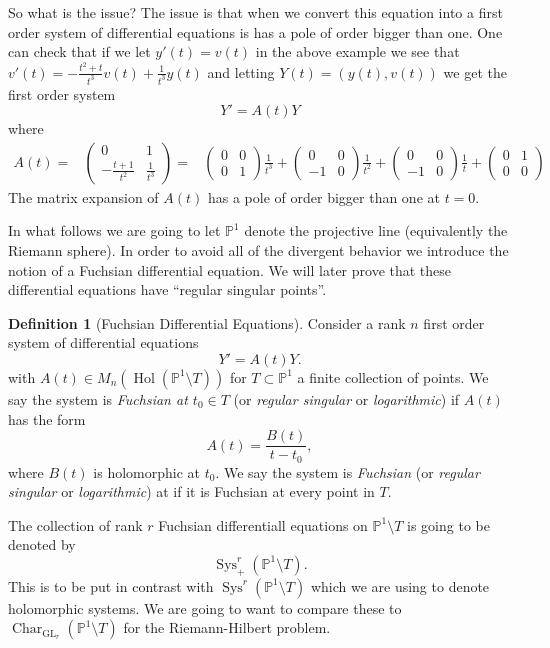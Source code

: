 \documentclass[12pt]{book}
\numberwithin{equation}{section}
\theoremstyle{definition}
\newtheorem{definition}[theorem]{Definition}
\theoremstyle{remark}
\newcommand{\PP}{\mathbb{P}}
\newcommand{\hol}{\operatorname{Hol}}
\newcommand{\GL}{\operatorname{GL}}
\newcommand{\Sys}{\operatorname{Sys}}
\newcommand{\Char}{\operatorname{Char}}
\begin{document}
So what is the issue? 
The issue is that when we convert this equation into a first order system of differential equations is has a pole of order bigger than one. 
One can check that if we let $y'(t)=v(t)$ in the above example we see that  $v'(t) = -\frac{t^2+t}{t^3}v(t)+\frac{1}{t^3}y(t)$ and letting $Y(t) = (y(t),v(t))$ we get the first order system 
 $$ Y' =A(t) Y $$
where 
\begin{align*}
 A(t) =& 
\begin{pmatrix}
0 & 1 \\
-\frac{t+1}{t^2} & \frac{1}{t^3}
\end{pmatrix} 
=&
\begin{pmatrix}
0 & 0 \\
0 & 1
\end{pmatrix} \frac{1}{t^3}
+\begin{pmatrix}
0 & 0 \\
-1 & 0 
\end{pmatrix}\frac{1}{t^2}
+
\begin{pmatrix}
0 & 0 \\
-1 & 0 
\end{pmatrix}\frac{1}{t}
+
\begin{pmatrix}
0 & 1 \\
0 & 0  
\end{pmatrix}
\end{align*}
The matrix expansion of $A(t)$ has a pole of order bigger than one at $t=0$. 

In what follows we are going to let $\PP^1$ denote the projective line (equivalently the Riemann sphere). 
In order to avoid all of the divergent behavior we introduce the notion of a Fuchsian differential equation. 
We will later prove that these differential equations have ``regular singular points''.
\begin{definition}[Fuchsian Differential Equations]
Consider a rank $n$ first order system of differential equations 
\begin{equation}\label{E:first-order-system}
  Y' = A(t) Y. 
 \end{equation}
with $A(t) \in M_n(\hol(\PP^1\setminus T))$ for $T\subset \PP^1$ a finite collection of points. 
We say the system  is \emph{Fuchsian at $t_0 \in T$} (or \emph{regular singular} or \emph{logarithmic}) if $A(t)$ has the form
		 $$ A(t) = \frac{B(t)}{t-t_0},$$
where $B(t)$ is  holomorphic at $t_0$. 
We say the system is \emph{Fuchsian} (or \emph{regular singular} or \emph{logarithmic}) at if it is Fuchsian at every point in $T$. 
\end{definition}
The collection of rank $r$ Fuchsian differentiall equations on $\PP^1\setminus T$ is going to be denoted by 
 $$ \Sys_+^r(\PP^1\setminus T). $$
This is to be put in contrast with $\Sys^r(\PP^1\setminus T)$ which we are using to denote holomorphic systems.
We are going to want to compare these to $\Char_{\GL_r}(\PP^1\setminus T)$ for the Riemann-Hilbert problem.
\end{document}
